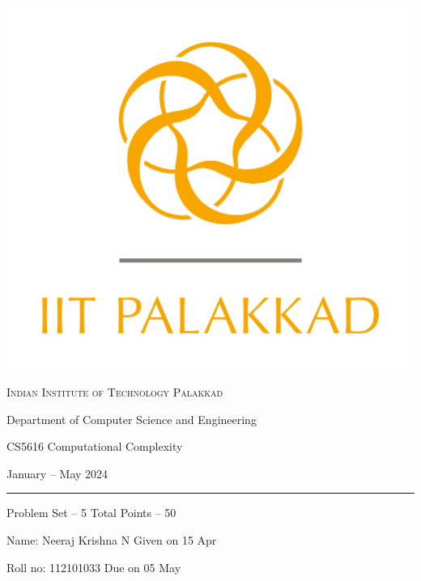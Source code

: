 \documentclass[12pt, a4paper,answers]{exam}
\begin{document}
	\noindent
	\begin{minipage}[l]{0.1\textwidth}
		\noindent
		\includegraphics[width=2.4\textwidth]{iitpkd}
	\end{minipage}
	\hfill
	\begin{minipage}[c]{0.8\textwidth}
		\begin{center}
			{\large \textsc{\textcolor{iitpkdcolor}{Indian Institute of Technology Palakkad}} \par
				\small	Department of Computer Science and Engineering	\par
				\large	CS5616 Computational Complexity \par 
				\small January -- May 2024}
		\end{center}
	\end{minipage}
	\par
\vspace{2mm}
\hrule
\vspace{2mm}
\begin{minipage}{0.9\textwidth} 
	\textsf{Problem Set} -- 5  \hfill  \textsf{Total Points} -- 50
	
	{\small \textsf{Name}: Neeraj Krishna N   \hfill \small \textsf{Given on} 15 Apr}
	
	{\small \textsf{Roll no}: 112101033  \hfill \small \textsf{Due on} 05 May }
\end{minipage}
	\vspace{0.2in}
\noindent
\end{document}
